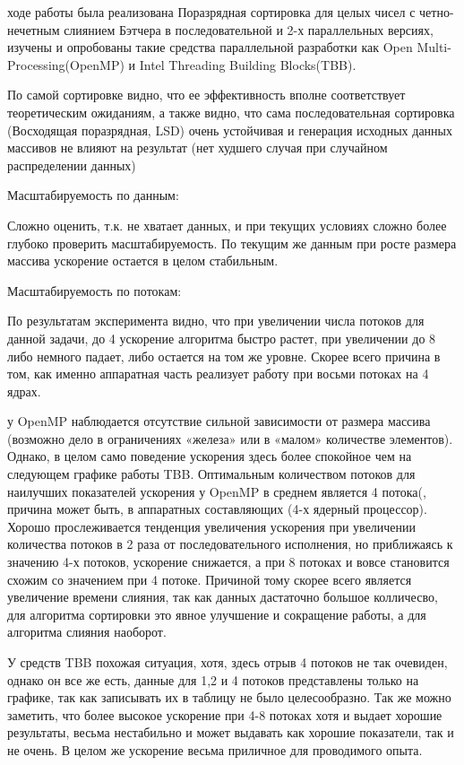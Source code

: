 \documentclass[a4paper,final]{report}
\begin{document}
\begin{spacing}{1.5}
		 ходе работы была реализована Поразрядная сортировка для целых чисел с четно-нечетным слиянием Бэтчера в последовательной и 2-х параллельных версиях, изучены и опробованы такие средства параллельной разработки как Open Multi-Processing(OpenMP) и Intel Threading Building Blocks(TBB). 
		\par По самой сортировке видно, что ее эффективность вполне соответствует теоретическим ожиданиям, а также видно, что сама последовательная сортировка (Восходящая поразрядная, LSD) очень устойчивая и генерация исходных данных массивов не влияют на результат (нет худшего случая при случайном распределении данных)
		\par Масштабируемость по данным: 
		\par Сложно оценить, т.к. не хватает данных, и при текущих условиях сложно более глубоко проверить масштабируемость. По текущим же данным при росте размера массива ускорение остается в целом стабильным. 
		\par Масштабируемость по потокам: 
		\par По результатам эксперимента видно, что при увеличении числа потоков для данной задачи, до 4 ускорение алгоритма быстро растет, при увеличении до 8 либо немного падает, либо остается на том же уровне. Скорее всего причина в том, как именно аппаратная часть реализует работу при восьми потоках на 4 ядрах. 
		\par у OpenMP наблюдается отсутствие сильной зависимости от размера массива (возможно дело в ограничениях «железа» или в «малом» количестве элементов). Однако, в целом само поведение ускорения здесь более спокойное чем на следующем графике работы TBB. Оптимальным количеством потоков для наилучших показателей ускорения у OpenMP в среднем является 4 потока(, причина может быть, в аппаратных составляющих (4-х ядерный процессор). Хорошо прослеживается тенденция увеличения ускорения при увеличении количества потоков в 2 раза от последовательного исполнения, но приближаясь к значению 4-х потоков, ускорение снижается, а при 8 потоках и вовсе становится схожим со значением при 4 потоке. Причиной тому скорее всего является увеличение времени слияния, так как данных дастаточно большое колличесво, для алгоритма сортировки это явное улучшение и сокращение работы, а для алгоритма слияния наоборот.  
        \par У средств TBB похожая ситуация, хотя, здесь отрыв 4 потоков не так очевиден, однако он все же есть, данные для 1,2 и 4 потоков представлены только на графике, так как записывать их в таблицу не было целесообразно. Так же можно заметить, что более высокое ускорение при 4-8 потоках хотя и выдает хорошие результаты, весьма нестабильно и может выдавать как хорошие показатели, так и не очень. В целом же ускорение весьма приличное для проводимого опыта. 

\end{spacing}
\end{document}
